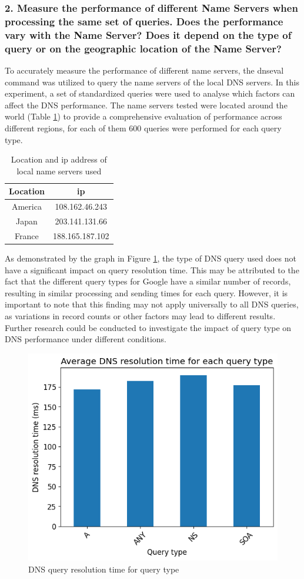 \documentclass[eng]{class}
\begin{document}
\subsubsection*{2. Measure the performance of different Name Servers when processing the same
  set of queries. Does the performance vary with the Name Server? Does it depend
  on the type of query or on the geographic location of the Name Server?}
To accurately measure the performance of different name servers, the dnseval command was utilized to query the name servers of the local DNS servers.
In this experiment, a set of standardized queries were used to analyse which factors can affect the DNS performance.
The name servers tested were located around the world (Table \ref*{tab-7}) to provide a comprehensive evaluation of performance across different regions,
for each of them 600 queries were performed for each query type.
\begin{table}[H]
  \centering
  \begin{tabular}{|c|c|}
    \hline
    \linewidth=0cm
    Location & ip              \\
    \hline
    America  & 108.162.46.243  \\
    Japan    & 203.141.131.66  \\
    France   & 188.165.187.102 \\
    \hline
  \end{tabular}
  \caption{Location and ip address of local name servers used}
  \label{tab-7}
\end{table}

As demonstrated by the graph in Figure \ref{fig-6}, the type of DNS query used does not have a significant impact on query resolution time.
This may be attributed to the fact that the different query types for Google have a similar number of records,
resulting in similar processing and sending times for each query.
However, it is important to note that this finding may not apply universally to all DNS queries, as variations in record counts or other factors may lead to different results.
Further research could be conducted to investigate the impact of query type on DNS performance under different conditions.

\begin{figure}[H]
  \centering
  \includegraphics[width=.7\columnwidth]{images/latQueryType.png}
  \caption{DNS query resolution time for query type}
  \label{fig-6}
\end{figure}
\end{document}
